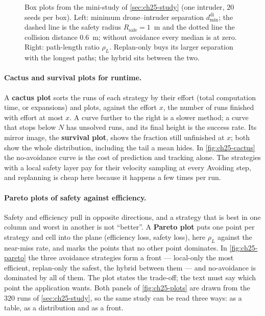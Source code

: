 \begin{figure}[tb]
  \centering
  \caption{Box plots from the mini-study of \cref{sec:ch25-study} (one
  intruder, $20$ seeds per box). Left: minimum drone--intruder separation
  $d_{\min}^{\mathrm{di}}$; the dashed line is the safety radius
  $R_{\mathrm{safe}} = 1$~m and the dotted line the collision distance
  $0.6$~m; without avoidance every median is at zero. Right: path-length
  ratio $\rho_L$. Replan-only buys its larger separation with the longest
  paths; the hybrid sits between the two.}
  \label{fig:ch25-boxplot}
\end{figure}

\paragraph{Cactus and survival plots for runtime.}
A \textbf{cactus plot} sorts the runs of each strategy by
their effort (total computation time, or expansions) and plots, against the
effort $x$, the number of runs finished with effort at most $x$. A curve
further to the right is a slower method; a curve that stops below $N$ has
unsolved runs, and its final height is the success rate. Its mirror image,
the \textbf{survival plot}, shows the fraction still
unfinished at $x$; both show the whole distribution, including the tail a
mean hides. In \cref{fig:ch25-cactus} the no-avoidance curve is the cost of
prediction and tracking alone. The strategies with a local safety layer pay for
their velocity sampling at every Avoiding step, and replanning is cheap here
because it happens a few times per run.

\paragraph{Pareto plots of safety against efficiency.}
Safety and efficiency pull in opposite directions, and a strategy that is
best in one column and worst in another is not ``better''. A
\textbf{Pareto plot} puts one point per strategy and cell
into the plane (efficiency loss, safety loss), here $\rho_L$ against the
near-miss rate, and marks the points that no other point dominates. In
\cref{fig:ch25-pareto} the three avoidance strategies form a front ---
local-only the most efficient, replan-only the safest, the hybrid between
them --- and no-avoidance is dominated by all of them. The plot states the
trade-off; the text must say which point the application wants. Both panels
of \cref{fig:ch25-plots} are drawn from the $320$ runs of
\cref{sec:ch25-study}, so the same study can be read three ways: as a table,
as a distribution and as a front.

